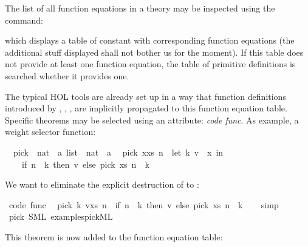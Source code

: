 \begin{isabellebody}
\isamarkuptrue%
%
\begin{isamarkuptext}%
The list of all function equations in a theory may be inspected
  using the \isasymPRINTCODETHMS command:%
\end{isamarkuptext}%
\isamarkuptrue%
\isamarkupfalse%
%
\begin{isamarkuptext}%
\noindent which displays a table of constant with corresponding
  function equations (the additional stuff displayed
  shall not bother us for the moment). If this table does
  not provide at least one function
  equation, the table of primitive definitions is searched
  whether it provides one.

  The typical HOL tools are already set up in a way that
  function definitions introduced by \isasymFUN, \isasymFUNCTION,
  \isasymPRIMREC, \isasymRECDEF are implicitly propagated
  to this function equation table. Specific theorems may be
  selected using an attribute: \emph{code func}. As example,
  a weight selector function:%
\end{isamarkuptext}%
\isamarkuptrue%
\isamarkupfalse%
\isanewline
\ \ pick\ {\isacharcolon}{\isacharcolon}\ {\isachardoublequoteopen}{\isacharparenleft}nat\ {\isasymtimes}\ {\isacharprime}a{\isacharparenright}\ list\ {\isasymRightarrow}\ nat\ {\isasymRightarrow}\ {\isacharprime}a{\isachardoublequoteclose}\isanewline
\isanewline
{}\isamarkupfalse%
\isanewline
\ \ {\isachardoublequoteopen}pick\ {\isacharparenleft}x{\isacharhash}xs{\isacharparenright}\ n\ {\isacharequal}\ {\isacharparenleft}let\ {\isacharparenleft}k{\isacharcomma}\ v{\isacharparenright}\ {\isacharequal}\ x\ in\isanewline
\ \ \ \ if\ n\ {\isacharless}\ k\ then\ v\ else\ pick\ xs\ {\isacharparenleft}n\ {\isacharminus}\ k{\isacharparenright}{\isacharparenright}{\isachardoublequoteclose}%
\begin{isamarkuptext}%
We want to eliminate the explicit destruction
  of  to :%
\end{isamarkuptext}%
\isamarkuptrue%
\isamarkupfalse%
\ {\isacharbrackleft}code\ func{\isacharbrackright}{\isacharcolon}\isanewline
\ \ {\isachardoublequoteopen}pick\ {\isacharparenleft}{\isacharparenleft}k{\isacharcomma}\ v{\isacharparenright}{\isacharhash}xs{\isacharparenright}\ n\ {\isacharequal}\ {\isacharparenleft}if\ n\ {\isacharless}\ k\ then\ v\ else\ pick\ xs\ {\isacharparenleft}n\ {\isacharminus}\ k{\isacharparenright}{\isacharparenright}{\isachardoublequoteclose}\isanewline
%
\isadelimproof
\ \ %
\endisadelimproof
%
\isatagproof
{}\isamarkupfalse%
\ simp%
\endisatagproof
{\isafoldproof}%
%
\isadelimproof
\isanewline
%
\endisadelimproof
\isanewline
{}\isamarkupfalse%
\ pick\ {\isacharparenleft}SML\ {\isachardoublequoteopen}examples{\isacharslash}pick{}{\isachardot}ML{\isachardoublequoteclose}{\isacharparenright}%
\begin{isamarkuptext}%
This theorem is now added to the function equation table:


\end{isamarkuptext}
\end{isabellebody}
